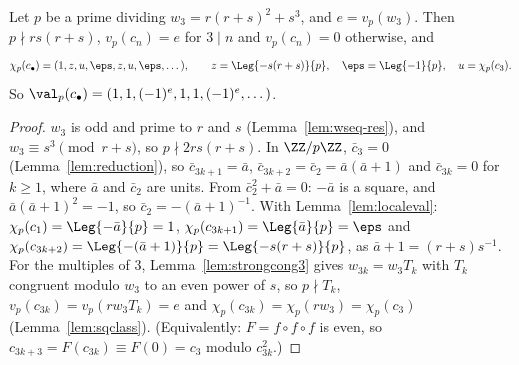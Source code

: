 \begin{lemma}
  \label{lem:period3}
  \leanok
  Let $p$ be a prime dividing $w_3 = r(r + s)^2 + s^3$, and $e = v_p(w_3)$. Then $p \nmid rs(r+s)$,
  $v_p(c_n) = e$ for $3 \mid n$ and $v_p(c_n) = 0$ otherwise, and
  \[ \chi_p(c_\bullet) = (1, z, u, \eps, z, u, \eps, \dots), \qquad
     z = \Leg{-s(r + s)}{p}, \quad \eps = \Leg{-1}{p}, \quad u = \chi_p(c_3). \]
  So $\val_p(c_\bullet) = (1, 1, (-1)^e, 1, 1, (-1)^e, \dots)$.
\end{lemma}
\begin{proof}
  \leanok
  $w_3$ is odd and prime to $r$ and $s$ (Lemma~\ref{lem:wseq-res}), and $w_3 \equiv s^3
  \pmod{r + s}$, so $p \nmid 2rs(r+s)$. In $\ZZ/p\ZZ$, $\bar c_3 = 0$ (Lemma~\ref{lem:reduction}), so
  $\bar c_{3k+1} = \bar a$, $\bar c_{3k+2} = \bar c_2 = \bar a(\bar a + 1)$ and $\bar c_{3k} = 0$
  for $k \ge 1$, where $\bar a$ and $\bar c_2$ are units. From $\bar c_2^2 + \bar a = 0$: $-\bar a$
  is a square, and $\bar a(\bar a + 1)^2 = -1$, so $\bar c_2 = -(\bar a + 1)^{-1}$. With
  Lemma~\ref{lem:localeval}: $\chi_p(c_1) = \Leg{-\bar a}{p} = 1$, $\chi_p(c_{3k+1}) =
  \Leg{\bar a}{p} = \eps$ and $\chi_p(c_{3k+2}) = \Leg{-(\bar a + 1)}{p} = \Leg{-s(r+s)}{p}$, as
  $\bar a + 1 = (r + s) s^{-1}$. For the multiples of $3$, Lemma~\ref{lem:strongcong3} gives
  $w_{3k} = w_3 T_k$ with $T_k$ congruent modulo $w_3$ to an even power of $s$, so $p \nmid T_k$,
  $v_p(c_{3k}) = v_p(r w_3 T_k) = e$ and $\chi_p(c_{3k}) = \chi_p(r w_3) = \chi_p(c_3)$
  (Lemma~\ref{lem:sqclass}). (Equivalently: $F = f \circ f \circ f$ is even, so
  $c_{3k+3} = F(c_{3k}) \equiv F(0) = c_3$ modulo $c_{3k}^2$.)
\end{proof}
